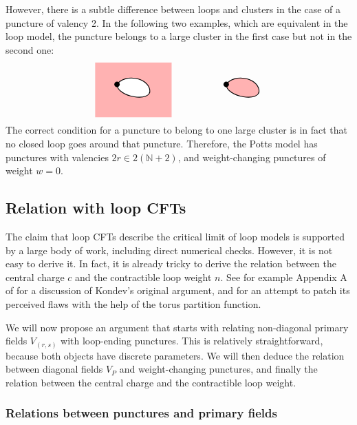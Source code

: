 \documentclass[12pt, a4paper]{article}
\theoremstyle{break}
\begin{document}
However, there is a subtle difference between loops and clusters in the case of a puncture of valency 2. In the following two examples, which are equivalent in the loop model, the puncture belongs to a large cluster in the first case but not in the second one: 
\begin{align}
 \begin{tikzpicture}[baseline=(current  bounding  box.center), scale = .4]
  \fill[red!30] (-2, -3) rectangle (5, 2);
  \filldraw[thick, fill = white] (0, 0) to [out = -90, in = -80] (3, -.5) to [out = 100, in = 55] (0, 0);
   \draw (0, 0) node[fill, circle, minimum size = 2mm, inner sep = 0]{};
   \filldraw[thick, fill = red!30] (10, 0) to [out = -90, in = -80] (13, -.5) to [out = 100, in = 55] (10, 0);
   \draw (10, 0) node[fill, circle, minimum size = 2mm, inner sep = 0]{};
 \end{tikzpicture}
\end{align}
The correct condition for a puncture to belong to one large cluster is in fact that no closed loop goes around that puncture. 
Therefore, the Potts model has punctures with valencies $2r\in 2(\mathbb{N}+2)$, and weight-changing punctures of weight $w=0$.


\subsection{Relation with loop CFTs}

The claim that loop CFTs describe the critical limit of loop models is supported by a large body of work, including direct numerical checks. However, it is not easy to derive it. In fact, it is already tricky to derive the relation between the central charge $c$ and the contractible loop weight $n$. See for example Appendix A of \cite{grz18} for a discussion of Kondev's original argument, and for an attempt to patch its perceived flaws with the help of the torus partition function. 

We will now propose an argument that starts with relating non-diagonal primary fields $V_{(r,s)}$ with loop-ending punctures. This is relatively straightforward, because both objects have discrete parameters. We will then deduce the relation between diagonal fields $V_P$ and weight-changing punctures, and finally the relation between the central charge and the contractible loop weight. 

\subsubsection{Relations between punctures and primary fields}
\end{document}
